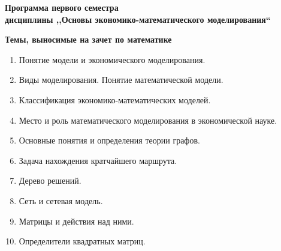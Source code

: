\documentclass[a4paper,12pt]{extarticle}
\begin{document}
\begin{center}
	\large
	\bfseries
    Программа первого семестра\\
     дисциплины 
	,,Основы экономико-математического моделирования``
\end{center}


\begin{center}
\bfseries
Темы, выносимые на зачет по математике 
\end{center}


\begin{enumerate}
    \item 
        Понятие модели и экономического моделирования.
    \item 
        Виды моделирования. Понятие математической модели.
    \item 
       Классификация экономико-математических моделей.
    \item 
        Место и роль математического моделирования в экономической науке.
    \item 
        Основные понятия и определения теории графов.
    \item 
        Задача нахождения кратчайшего маршрута.
    \item 
        Дерево решений.
    \item 
        Сеть и сетевая модель.
    \item 
        Матрицы и действия над ними.
    \item 
        Определители квадратных матриц. 
  

\end{enumerate}
\end{document}
